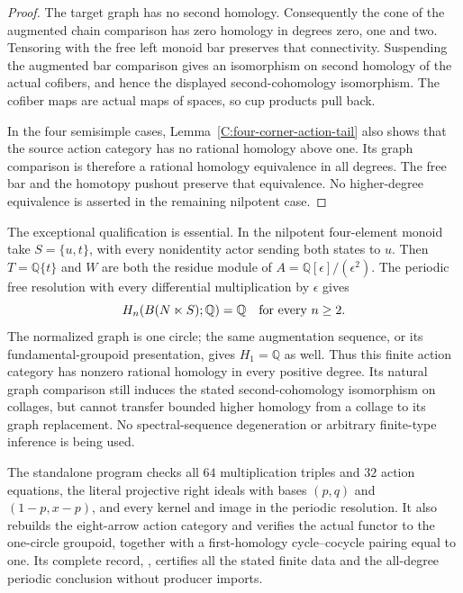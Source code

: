 \begin{proof}
The target graph has no second homology.  Consequently the
cone of the augmented chain comparison has zero homology
in degrees zero, one and two.  Tensoring with the free left
monoid bar preserves that connectivity.  Suspending the
augmented bar comparison gives an isomorphism on second
homology of the actual cofibers, and hence the displayed
second-cohomology isomorphism.  The cofiber maps are actual
maps of spaces, so cup products pull back.

In the four semisimple cases,
Lemma~\ref{C:four-corner-action-tail} also shows that the
source action category has no rational homology above one.
Its graph comparison is therefore a rational homology
equivalence in all degrees.  The free bar and the homotopy
pushout preserve that equivalence.  No higher-degree
equivalence is asserted in the remaining nilpotent case.
\end{proof}

\begin{remark}
\label{C:small-opposite-graph-higher-homology-warning}
The exceptional qualification is essential.  In the
nilpotent four-element monoid take $S=\{u,t\}$, with every
nonidentity actor sending both states to $u$.  Then
$T=\mathbb Q\{t\}$ and $W$ are both the residue module of
$A=\mathbb Q[\epsilon]/(\epsilon^2)$.  The periodic free
resolution with every differential multiplication by
$\epsilon$ gives
\[
 H_n(B(N\ltimes S);\mathbb Q)=\mathbb Q
 \quad\hbox{for every }n\geq2.
\]
The normalized graph is one circle; the same augmentation
sequence, or its fundamental-groupoid presentation, gives
$H_1=\mathbb Q$ as well.  Thus this finite action category
has nonzero rational homology in every positive degree.
Its natural graph comparison still induces the stated
second-cohomology isomorphism on collages, but cannot
transfer bounded higher homology from a collage to its
graph replacement.  No spectral-sequence degeneration
or arbitrary finite-type inference is being used.

The standalone program
checks all $64$ multiplication triples and $32$ action
equations, the literal projective right ideals with bases
$(p,q)$ and $(1-p,x-p)$, and every kernel and image in the
periodic resolution.  It also rebuilds the eight-arrow
action category and verifies the actual functor to the
one-circle groupoid, together with a first-homology
cycle--cocycle pairing equal to one.  Its complete record,
,
certifies all the stated finite data and the all-degree
periodic conclusion without producer imports.
\end{remark}


